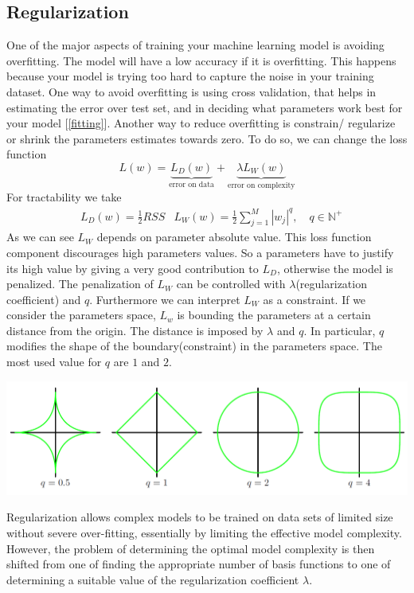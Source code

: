 \documentclass[main.tex]{subfiles}
\begin{document}
\subsection{Regularization}
One of the major aspects of training your machine learning model is avoiding overfitting. The model will have a low accuracy if it is overfitting. This happens because your model is trying too hard to capture the noise in your training dataset. One way to avoid overfitting is using cross validation, that helps in estimating the error over test set, and in deciding what parameters work best for your model [\ref{fitting}]. Another way to reduce overfitting is constrain/ regularize or shrink the parameters estimates towards zero. To do so, we can change the loss function
\begin{equation}
    L(w)=\underbrace{L_D(w)}_{\text{error on data}}+ \underbrace{\lambda L_W(w)}_{\text{error on complexity}}
\end{equation}
For tractability we take
\begin{align*}
   & L_D(w)=\frac{1}{2}RSS &L_W(w)=\frac{1}{2}\sum_{j=1}^M |w_j|^q, \quad q\in\mathbb{N}^+
\end{align*}
As we can see $L_W$ depends on parameter absolute value. This loss function component discourages high parameters values. So a parameters have to justify its high value by giving a very good contribution to $L_D$, otherwise the model is penalized.
The penalization of $L_W$ can be controlled with $\lambda$(regularization coefficient) and $q$.
Furthermore we can interpret $L_W$ as a constraint. If we consider the parameters space, $L_w$ is bounding the parameters at a certain distance from the origin. The distance is imposed by $\lambda$ and $q$. In particular, $q$ modifies the shape of the boundary(constraint) in the parameters space.
The most used value for $q$ are $1$ and $2$.
\begin{center}
    \includegraphics[scale=0.4]{img/Q_boundaries_regularization.PNG}
\end{center}
Regularization allows complex models to be trained on data sets of limited size
without severe over-fitting, essentially by limiting the effective model complexity.
However, the problem of determining the optimal model complexity is then shifted
from one of finding the appropriate number of basis functions to one of determining
a suitable value of the regularization coefficient $\lambda$.
\end{document}
